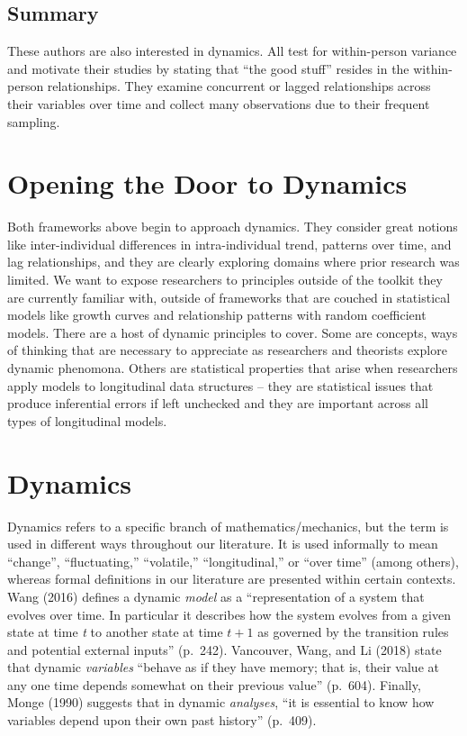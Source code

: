 \documentclass[english,,man]{apa6}
\theoremstyle{definition}
\theoremstyle{definition}
\theoremstyle{definition}
\theoremstyle{remark}
\begin{document}
\hypertarget{summary-1}{%
\subsection{Summary}\label{summary-1}}

These authors are also interested in dynamics. All test for
within-person variance and motivate their studies by stating that
\enquote{the good stuff} resides in the within-person relationships.
They examine concurrent or lagged relationships across their variables
over time and collect many observations due to their frequent sampling.

\hypertarget{opening-the-door-to-dynamics}{%
\section{Opening the Door to
Dynamics}\label{opening-the-door-to-dynamics}}

Both frameworks above begin to approach dynamics. They consider great
notions like inter-individual differences in intra-individual trend,
patterns over time, and lag relationships, and they are clearly
exploring domains where prior research was limited. We want to expose
researchers to principles outside of the toolkit they are currently
familiar with, outside of frameworks that are couched in statistical
models like growth curves and relationship patterns with random
coefficient models. There are a host of dynamic principles to cover.
Some are concepts, ways of thinking that are necessary to appreciate as
researchers and theorists explore dynamic phenomona. Others are
statistical properties that arise when researchers apply models to
longitudinal data structures -- they are statistical issues that produce
inferential errors if left unchecked and they are important across all
types of longitudinal models.

\hypertarget{dynamics}{%
\section{Dynamics}\label{dynamics}}

Dynamics refers to a specific branch of mathematics/mechanics, but the
term is used in different ways throughout our literature. It is used
informally to mean \enquote{change}, \enquote{fluctuating,}
\enquote{volatile,} \enquote{longitudinal,} or \enquote{over time}
(among others), whereas formal definitions in our literature are
presented within certain contexts. Wang (2016) defines a dynamic
\emph{model} as a \enquote{representation of a system that evolves over
time. In particular it describes how the system evolves from a given
state at time \emph{t} to another state at time \(t + 1\) as governed by
the transition rules and potential external inputs} (p.~242). Vancouver,
Wang, and Li (2018) state that dynamic \emph{variables} \enquote{behave
as if they have memory; that is, their value at any one time depends
somewhat on their previous value} (p.~604). Finally, Monge (1990)
suggests that in dynamic \emph{analyses}, \enquote{it is essential to
know how variables depend upon their own past history} (p.~409).
\end{document}
